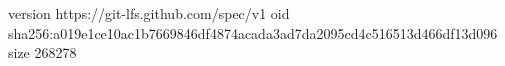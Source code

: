 version https://git-lfs.github.com/spec/v1
oid sha256:a019e1ce10ac1b7669846df4874acada3ad7da2095cd4c516513d466df13d096
size 268278
